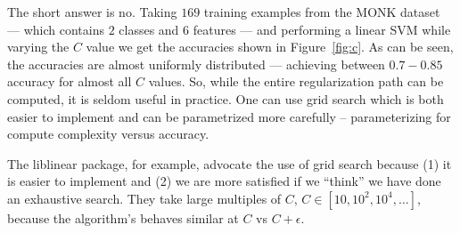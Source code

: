 \documentclass[
10pt, %
letterpaper, %
oneside, %
headinclude,footinclude, %
BCOR5mm, %
]{scrartcl}
\begin{document}
The short answer is no. 
Taking $169$ training examples from the MONK dataset --- which contains $2$ classes and $6$ features --- and performing a linear SVM while varying the $C$ value we get the accuracies shown in Figure~\ref{fig:c}.
As can be seen, the accuracies are almost uniformly distributed --- achieving between $0.7-0.85$ accuracy for almost all $C$ values.
So, while the entire regularization path can be computed, it is seldom useful in practice.
One can use grid search which is both easier to implement and can be parametrized more carefully -- parameterizing for compute complexity versus accuracy.

The liblinear package, for example, advocate the use of grid search because (1) it is easier to implement and (2) we are more satisfied if we ``think'' we have done an exhaustive search. They take large multiples of $C$, $C \in [10, 10^2, 10^4, \ldots]$, because the algorithm's behaves similar at $C$ vs $C + \epsilon$.

\end{document}
